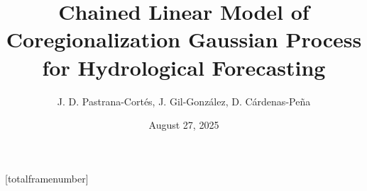\author{%
	J. D. Pastrana-Cortés, J. Gil-González, D. Cárdenas-Peña
}


\title[Chained LMC GP for Hydrological Forecasting]{\textbf{Chained Linear Model of Coregionalization Gaussian Process for Hydrological Forecasting}}
\date[2025]{August 27, 2025}



[totalframenumber]
